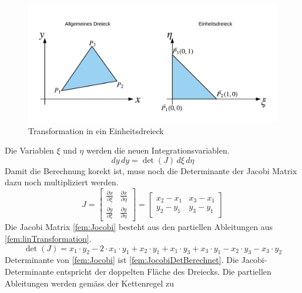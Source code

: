 \begin{figure}[h!]
	\centering
	\includegraphics[scale=0.8]{papers/fem/Images/Dreiecke.jpeg}
	\caption{Transformation in ein Einheitsdreieck}
	\label{fig:TransformationEinheitsdreieckBild}
\end{figure}
Die Variablen $\xi$ und $\eta$ werden die neuen Integrationsvariablen.
\begin{equation}
			dy \, dy = \det(J) \, d\xi \, d\eta
			\label{fem:newTransformation}
\end{equation}
Damit die Berechnung korekt ist, muss noch die Determinante der Jacobi Matrix dazu noch multipliziert werden.
\begin{equation}
J %
=
\begin{bmatrix}
    \frac{\partial x}{\partial \xi} &  \frac{\partial x}{\partial \eta}     \\
   \frac{\partial y}{\partial \xi}  &  \frac{\partial y}{\partial \eta}     
\end{bmatrix}
= 
\begin{bmatrix}
    x_2 - x_1  &  x_3 -x_1      \\
    y_2 - y_1  &  y_3 - y_1      
\end{bmatrix} 
	\label{fem:Jocobi}
\end{equation}
Die Jacobi Matrix \ref{fem:Jocobi} besteht aus den partiellen Ableitungen aus \ref{fem:linTransformation}.  
\begin{equation}
	\det(J) = x_1 \cdot y_2 - 2 \cdot x_1 \cdot y_1 + x_2 \cdot y_1 + x_1\cdot y_3 + x_3 \cdot y_1 - x_2 \cdot y_3 - x_3 \cdot y_2
	\label{fem:JocobiDetBerechnet}
\end{equation}
Determinante von \ref{fem:Jocobi} ist \eqref{fem:JocobiDetBerechnet}. Die Jacobi- Determinante entspricht der doppelten Fläche des Dreiecks. Die partiellen Ableitungen werden gemäss der Kettenregel zu 
